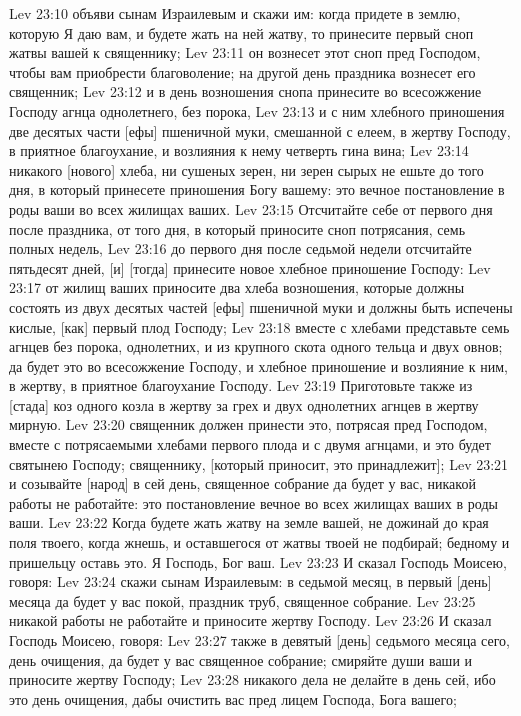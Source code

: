 Lev 23:10  объяви сынам Израилевым и скажи им: когда придете в землю, которую Я даю вам, и будете жать на ней жатву, то принесите первый сноп жатвы вашей к священнику;
Lev 23:11  он вознесет этот сноп пред Господом, чтобы вам приобрести благоволение; на другой день праздника вознесет его священник;
Lev 23:12  и в день возношения снопа принесите во всесожжение Господу агнца однолетнего, без порока,
Lev 23:13  и с ним хлебного приношения две десятых части [ефы] пшеничной муки, смешанной с елеем, в жертву Господу, в приятное благоухание, и возлияния к нему четверть гина вина;
Lev 23:14  никакого [нового] хлеба, ни сушеных зерен, ни зерен сырых не ешьте до того дня, в который принесете приношения Богу вашему: это вечное постановление в роды ваши во всех жилищах ваших.
Lev 23:15  Отсчитайте себе от первого дня после праздника, от того дня, в который приносите сноп потрясания, семь полных недель,
Lev 23:16  до первого дня после седьмой недели отсчитайте пятьдесят дней, [и] [тогда] принесите новое хлебное приношение Господу:
Lev 23:17  от жилищ ваших приносите два хлеба возношения, которые должны состоять из двух десятых частей [ефы] пшеничной муки и должны быть испечены кислые, [как] первый плод Господу;
Lev 23:18  вместе с хлебами представьте семь агнцев без порока, однолетних, и из крупного скота одного тельца и двух овнов; да будет это во всесожжение Господу, и хлебное приношение и возлияние к ним, в жертву, в приятное благоухание Господу.
Lev 23:19  Приготовьте также из [стада] коз одного козла в жертву за грех и двух однолетних агнцев в жертву мирную.
Lev 23:20  священник должен принести это, потрясая пред Господом, вместе с потрясаемыми хлебами первого плода и с двумя агнцами, и это будет святынею Господу; священнику, [который приносит, это принадлежит];
Lev 23:21  и созывайте [народ] в сей день, священное собрание да будет у вас, никакой работы не работайте: это постановление вечное во всех жилищах ваших в роды ваши.
Lev 23:22  Когда будете жать жатву на земле вашей, не дожинай до края поля твоего, когда жнешь, и оставшегося от жатвы твоей не подбирай; бедному и пришельцу оставь это. Я Господь, Бог ваш.
Lev 23:23  И сказал Господь Моисею, говоря:
Lev 23:24  скажи сынам Израилевым: в седьмой месяц, в первый [день] месяца да будет у вас покой, праздник труб, священное собрание.
Lev 23:25  никакой работы не работайте и приносите жертву Господу.
Lev 23:26  И сказал Господь Моисею, говоря:
Lev 23:27  также в девятый [день] седьмого месяца сего, день очищения, да будет у вас священное собрание; смиряйте души ваши и приносите жертву Господу;
Lev 23:28  никакого дела не делайте в день сей, ибо это день очищения, дабы очистить вас пред лицем Господа, Бога вашего;
